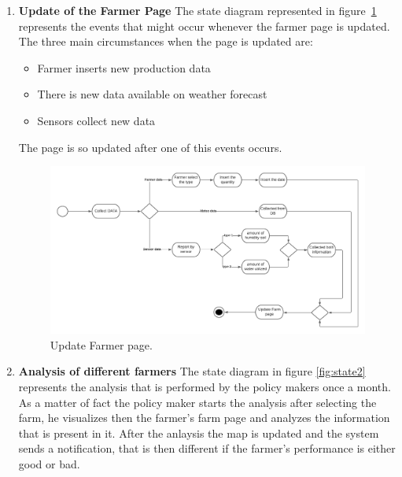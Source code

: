 \begin{enumerate}
    \item \textbf{Update of the Farmer Page}
        The state diagram represented in figure~\ref{fig:state1} represents 
        the events that might occur whenever the farmer page is updated.
        The three main circumstances when the page is updated are:
        \begin {itemize}
        \item Farmer inserts new production data
        \item There is new data available on weather forecast
        \item Sensors collect new data
        \end{itemize}
        The page is so updated after one of this events occurs.

    \begin{figure}[H]
        \begin{center}
        \includegraphics[width=1\textwidth]{images/State chart 1.png}
        \caption{Update Farmer page.}
        \label{fig:state1}
        \end{center}
    \end{figure}

    \item \textbf{Analysis of different farmers}
    The state diagram in figure \ref{fig:state2} represents the analysis that is performed 
    by the policy makers once a month.
    As a matter of fact the policy maker starts the analysis after selecting the farm, he visualizes then the farmer's farm page and analyzes the information 
    that is present in it. After the anlaysis the map is updated and the system sends a notification, that is then different if the 
    farmer’s performance is either good or bad.


\end{enumerate}
